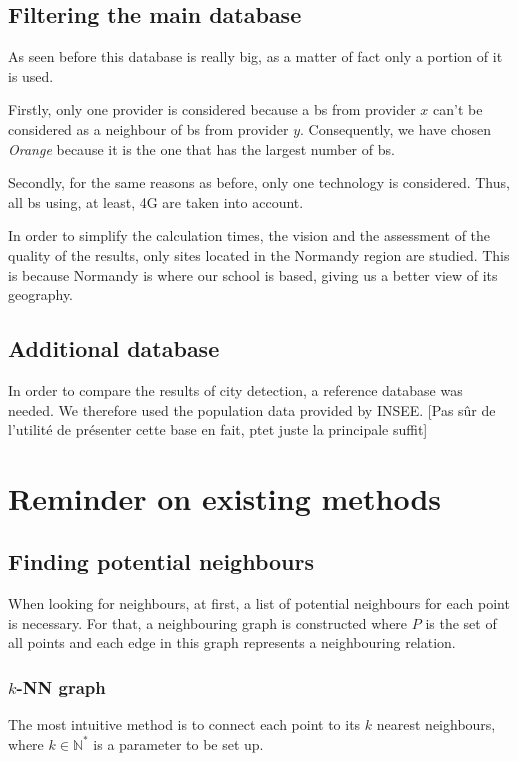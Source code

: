 \documentclass[lettersize,journal,english]{IEEEtran}
\begin{document}
    \subsection{Filtering the main database}
        As seen before this database is really big, as a matter of fact only a portion of it is used.

        Firstly, only one provider is considered because a \acrshort{bs} from provider $x$ can't be considered as a neighbour of \acrshort{bs} from provider $y$.
        Consequently, we have chosen \emph{Orange} because it is the one that has the largest number of \acrshort{bs}.

        Secondly, for the same reasons as before, only one technology is considered. Thus, all \acrshort{bs} using, at least, 4G are taken into account.

        In order to simplify the calculation times, the vision and the assessment of the quality of the results, only sites located in the Normandy region are studied.
        This is because Normandy is where our school is based, giving us a better view of its geography.

    \subsection{Additional database}
        In order to compare the results of city detection, a reference database was needed. We therefore used the population data provided by INSEE.
        [Pas sûr de l'utilité de présenter cette base en fait, ptet juste la principale suffit]

\section{Reminder on existing methods\label{sec:reminder}}
    \subsection{Finding potential neighbours}
        When looking for neighbours, at first, a list of potential neighbours for each point is necessary.
        For that, a neighbouring graph is constructed where $P$ is the set of all points and each edge in this graph represents a neighbouring relation.

        \subsubsection{$k$-NN graph}
            The most intuitive method is to connect each point to its $k$ nearest neighbours, where $k \in \mathbb{N}^*$ is a parameter to be set up. 
\end{document}
